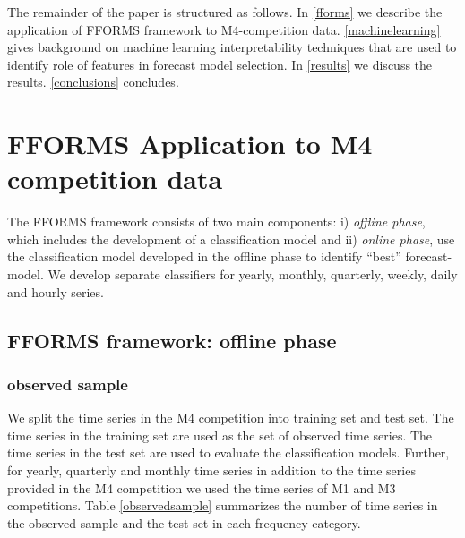 \documentclass[11pt,a4paper,]{article}
\begin{document}
The remainder of the paper is structured as follows. In \autoref{fforms}
we describe the application of FFORMS framework to M4-competition data.
\autoref{machinelearning} gives background on machine learning
interpretability techniques that are used to identify role of features
in forecast model selection. In \autoref{results} we discuss the
results. \autoref{conclusions} concludes.

\section{FFORMS Application to M4 competition data}\label{fforms}

The FFORMS framework consists of two main components: i) \emph{offline
phase}, which includes the development of a classification model and ii)
\emph{online phase}, use the classification model developed in the
offline phase to identify ``best'' forecast-model. We develop separate
classifiers for yearly, monthly, quarterly, weekly, daily and hourly
series.

\subsection{FFORMS framework: offline
phase}\label{fforms-framework-offline-phase}

\subsubsection{observed sample}\label{observed-sample}

We split the time series in the M4 competition into training set and
test set. The time series in the training set are used as the set of
observed time series. The time series in the test set are used to
evaluate the classification models. Further, for yearly, quarterly and
monthly time series in addition to the time series provided in the M4
competition we used the time series of M1 and M3 competitions. Table
\ref{observedsample} summarizes the number of time series in the
observed sample and the test set in each frequency category.
\end{document}
